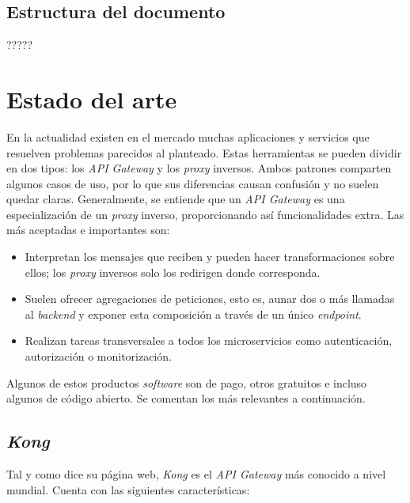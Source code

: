 \documentclass[11pt,spanish,listoffigures]{tfgetsinf}
\begin{document}
\section{Estructura del documento}

?????


\chapter{Estado del arte}

En la actualidad existen en el mercado muchas aplicaciones y servicios que resuelven problemas parecidos al planteado. Estas herramientas se pueden dividir en dos tipos: los \emph{API Gateway} y los \emph{proxy} inversos. Ambos patrones comparten algunos casos de uso, por lo que sus diferencias causan confusión y no suelen quedar claras. Generalmente, se entiende que un \emph{API Gateway} es una especialización de un \emph{proxy} inverso, proporcionando así funcionalidades extra. Las más aceptadas e importantes son:

\begin{itemize}

	\item Interpretan los mensajes que reciben y pueden hacer transformaciones sobre ellos; los \emph{proxy} inversos solo los redirigen donde corresponda.
	\item Suelen ofrecer agregaciones de peticiones, esto es, aunar dos o más llamadas al \emph{backend} y exponer esta composición a través de un único \emph{endpoint}.
	\item Realizan tareas transversales a todos los microservicios como autenticación, autorización o monitorización.

\end{itemize}

Algunos de estos productos \emph{software} son de pago, otros gratuitos e incluso algunos de código abierto. Se comentan los más relevantes a continuación.

\section{\emph{Kong}}
Tal y como dice su página web, \emph{Kong} \cite{Kong} es el \emph{API Gateway} más conocido a nivel mundial. Cuenta con las siguientes características:
\end{document}
